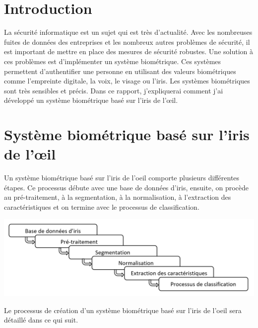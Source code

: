 \documentclass[12pt,twoside,letterpaper]{article}
\begin{document}



\tableofcontents
\newpage

\section{Introduction}
La sécurité informatique est un sujet qui est très d'actualité. Avec les nombreuses fuites de données des entreprises et les nombreux autres problèmes de sécurité, il est important de mettre en place des mesures de sécurité robustes. Une solution à ces problèmes est d'implémenter un système biométrique. Ces systèmes permettent d'authentifier une personne en utilisant des valeurs biométriques comme l'empreinte digitale, la voix, le visage ou l'iris. Les systèmes biométriques sont très sensibles et précis. Dans ce rapport, j'expliquerai comment j'ai développé un système biométrique basé sur l’iris de l’œil.
\cite{ref_06}

\section{Système biométrique basé sur l’iris de l’œil}

Un système biométrique basé sur l'iris de l'oeil comporte plusieurs différentes étapes. Ce processus débute avec une base de données d'iris, ensuite, on procède au pré-traitement, à la segmentation, à la normalisation, à l'extraction des caractéristiques et on termine avec le processus de classification. 

\begin{center}
    \includegraphics[width = 14cm]{schema}
\end{center}

Le processus de création d'un système biométrique basé sur l'iris de l'oeil sera détaillé dans ce qui suit.
\end{document}
